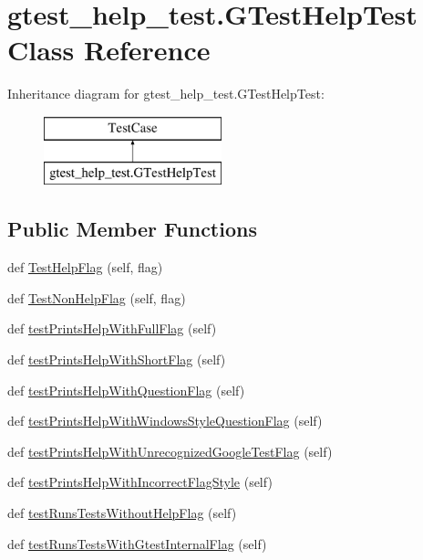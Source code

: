 \hypertarget{classgtest__help__test_1_1_g_test_help_test}{}\section{gtest\+\_\+help\+\_\+test.\+G\+Test\+Help\+Test Class Reference}
\label{classgtest__help__test_1_1_g_test_help_test}
Inheritance diagram for gtest\+\_\+help\+\_\+test.\+G\+Test\+Help\+Test\+:\begin{figure}[H]
\begin{center}
\leavevmode
\includegraphics[height=2.000000cm]{classgtest__help__test_1_1_g_test_help_test}
\end{center}
\end{figure}
\subsection*{Public Member Functions}
\begin{DoxyCompactItemize}
\item 
def \hyperlink{classgtest__help__test_1_1_g_test_help_test_a26cc1a64bd67278252ebfcd0ac0dca0c}{Test\+Help\+Flag} (self, flag)
\item 
def \hyperlink{classgtest__help__test_1_1_g_test_help_test_a03ffa91ecf6193ed2ed80b53933112ab}{Test\+Non\+Help\+Flag} (self, flag)
\item 
def \hyperlink{classgtest__help__test_1_1_g_test_help_test_ad91b46ad4506ff52b337b63f6b6c2ad1}{test\+Prints\+Help\+With\+Full\+Flag} (self)
\item 
def \hyperlink{classgtest__help__test_1_1_g_test_help_test_a3dd96058d093a89350769b4e2cc36563}{test\+Prints\+Help\+With\+Short\+Flag} (self)
\item 
def \hyperlink{classgtest__help__test_1_1_g_test_help_test_aafd4d1857c2538c8b1f7cc5a5d1e38b4}{test\+Prints\+Help\+With\+Question\+Flag} (self)
\item 
def \hyperlink{classgtest__help__test_1_1_g_test_help_test_a7be99cd30193e2eecf79f9d65f561afc}{test\+Prints\+Help\+With\+Windows\+Style\+Question\+Flag} (self)
\item 
def \hyperlink{classgtest__help__test_1_1_g_test_help_test_a701abb8f34df726b9129d7654cb32066}{test\+Prints\+Help\+With\+Unrecognized\+Google\+Test\+Flag} (self)
\item 
def \hyperlink{classgtest__help__test_1_1_g_test_help_test_ab8d379bbb0da7403ced599f4ee498728}{test\+Prints\+Help\+With\+Incorrect\+Flag\+Style} (self)
\item 
def \hyperlink{classgtest__help__test_1_1_g_test_help_test_ae7831f92e8e3763c07afb908915b3d20}{test\+Runs\+Tests\+Without\+Help\+Flag} (self)
\item 
def \hyperlink{classgtest__help__test_1_1_g_test_help_test_a0ebec2e3154d22a63e362d2196f9c638}{test\+Runs\+Tests\+With\+Gtest\+Internal\+Flag} (self)
\end{DoxyCompactItemize}


